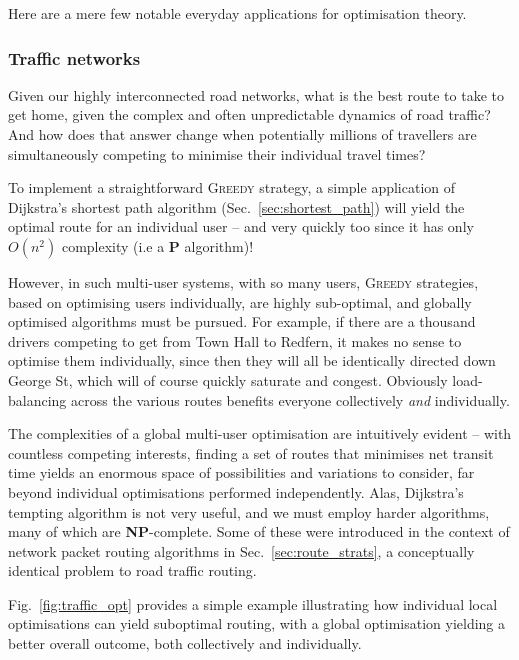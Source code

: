 Here are a mere few notable everyday applications for optimisation theory.

\subsubsection{Traffic networks}

Given our highly interconnected road networks, what is the best route to take to get home, given the  complex and often unpredictable dynamics of road traffic? And how does that answer change when potentially millions of travellers are simultaneously competing to minimise their individual travel times?

To implement a straightforward \textsc{Greedy} strategy, a simple application of Dijkstra's shortest path algorithm (Sec.~\ref{sec:shortest_path}) will yield the optimal route for an individual user -- and very quickly too since it has only $O(n^2)$ complexity (i.e a \textbf{P} algorithm)!

However, in such multi-user systems, with so many users, \textsc{Greedy} strategies, based on optimising users individually, are highly sub-optimal, and globally optimised algorithms must be pursued. For example, if there are a thousand drivers competing to get from Town Hall to Redfern, it makes no sense to optimise them individually, since then they will all be identically directed down George St, which will of course quickly saturate and congest. Obviously load-balancing across the various routes benefits everyone collectively \textit{and} individually.

The complexities of a global multi-user optimisation are intuitively evident -- with countless competing interests, finding a set of routes that minimises net transit time yields an enormous space of possibilities and variations to consider, far beyond individual optimisations performed independently. Alas, Dijkstra's tempting algorithm is not very useful, and we must employ harder algorithms, many of which are \textbf{NP}-complete. Some of these were introduced in the context of network packet routing algorithms in Sec.~\ref{sec:route_strats}, a conceptually identical problem to road traffic routing.

Fig.~\ref{fig:traffic_opt} provides a simple example illustrating how individual local optimisations can yield suboptimal routing, with a global optimisation yielding a better overall outcome, both collectively and individually.

